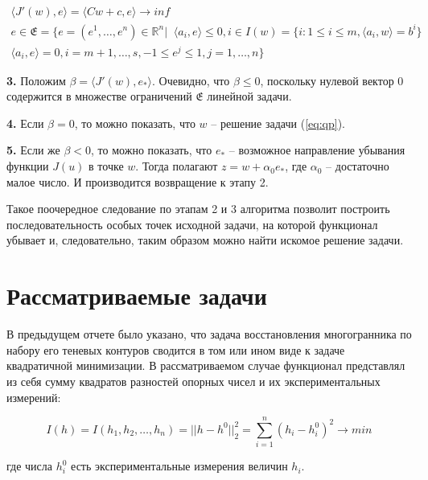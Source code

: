 \documentclass[a4paper, 12pt, titlepage]{article}
\theoremstyle{definition}
\theoremstyle{plain}
\theoremstyle{plain}
\begin{document}
\begin{equation}
 \begin{aligned}
 \langle J'(w), e \rangle = \langle C w + c, e \rangle \to inf \\
 e \in \mathfrak{E} = \{e = (e^{1}, \ldots, e^{n}) \in \mathbb{R}^{n} | \;\;
 \langle a_{i}, e \rangle \leq 0, i \in I(w) = \{i: 1 \leq i \leq m,
 \langle a_{i}, w \rangle = b^{i}\} \\
 \langle a_{i}, e \rangle = 0, i = m + 1, \ldots, s, -1 \leq e^{j} \leq 1,
 j = 1, \ldots, n\}
 \end{aligned}
\end{equation}

\textbf{3.} Положим $\beta = \langle J'(w), e_{*} \rangle$. Очевидно, что
$\beta \leq 0$, поскольку нулевой вектор $0$ содержится в множестве
ограничений $\mathfrak{E}$ линейной задачи.

\textbf{4.} Если $\beta = 0$, то можно показать, что $w$ -- решение задачи
(\ref{eq:qp}).

\textbf{5.} Если же $\beta < 0$, то можно показать, что $e_{*}$ -- возможное
направление убывания функции $J(u)$ в точке $w$. Тогда полагают
$z = w + \alpha_{0} e_{*}$, где $\alpha_{0}$ -- достаточно малое число. И
производится возвращение к этапу 2.

Такое поочередное следование по этапам 2 и 3 алгоритма позволит 
построить последовательность особых точек исходной задачи, на которой 
функционал убывает и, следовательно, таким образом можно найти искомое решение
задачи.



\section{Рассматриваемые задачи}
\label{sec:problem}

В предыдущем отчете было указано, что задача восстановления многогранника по
набору его теневых контуров сводится в том или ином виде к задаче квадратичной
минимизации. В рассматриваемом случае функционал представлял из себя сумму
квадратов разностей опорных чисел и их экспериментальных измерений:

\begin{equation}
\label{eq:problem1}
 I(h) = I(h_{1}, h_{2}, \ldots, h_{n}) = ||h - h^{0}||_{2}^{2} =
 \sum \limits_{i = 1}^{n} (h_{i} - h_{i}^{0})^{2} \to min
\end{equation}

где числа $h_{i}^{0}$ есть экспериментальные измерения величин $h_{i}$.
\end{document}
